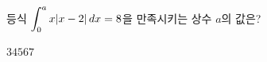 등식 $\displaystyle\int_{0}^{a}x|x-2|\mkern3mu dx=8$을 만족시키는 상수 $a$의 값은? 
\begin{choices32}{$3$}{$4$}{$5$}{$6$}{$7$}\end{choices32}
